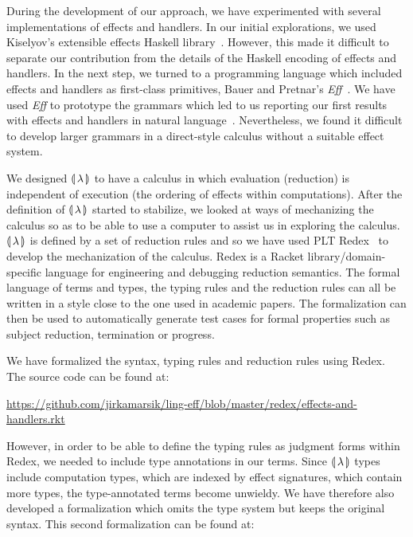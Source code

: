 \label{chap:mechanization}

During the development of our approach, we have experimented with several
implementations of effects and handlers. In our initial explorations, we
used Kiselyov's extensible effects Haskell
library~\cite{kiselyov2013extensible,extensible-effects}. However, this
made it difficult to separate our contribution from the details of the
Haskell encoding of effects and handlers. In the next step, we turned to a
programming language which included effects and handlers as first-class
primitives, Bauer and Pretnar's \emph{Eff}~\cite{bauer2012programming}. We
have used \emph{Eff} to prototype the grammars which led to us reporting
our first results with effects and handlers in natural
language~\cite{marsik2014algebraic}. Nevertheless, we found it difficult to
develop larger grammars in a direct-style calculus without a suitable
effect system.

We designed ${\llparenthesis \, \lambda \, \rrparenthesis}$ to have a calculus in which evaluation (reduction) is
independent of execution (the ordering of effects within
computations). After the definition of ${\llparenthesis \, \lambda \, \rrparenthesis}$ started to stabilize, we
looked at ways of mechanizing the calculus so as to be able to use a
computer to assist us in exploring the calculus. ${\llparenthesis \, \lambda \, \rrparenthesis}$ is defined by a
set of reduction rules and so we have used PLT
Redex~\cite{felleisen2009semantics} to develop the mechanization of the
calculus. Redex is a Racket library/domain-specific language for
engineering and debugging reduction semantics. The formal language of terms
and types, the typing rules and the reduction rules can all be written in a
style close to the one used in academic papers. The formalization can then
be used to automatically generate test cases for formal properties such as
subject reduction, termination or progress.

We have formalized the syntax, typing rules and reduction rules using
Redex. The source code can be found at:

\centerline{\url{https://github.com/jirkamarsik/ling-eff/blob/master/redex/effects-and-handlers.rkt}}

However, in order to be able to define the typing rules as judgment forms
within Redex, we needed to include type annotations in our terms. Since
${\llparenthesis \, \lambda \, \rrparenthesis}$ types include computation types, which are indexed by effect
signatures, which contain more types, the type-annotated terms become
unwieldy. We have therefore also developed a formalization which omits the
type system but keeps the original syntax. This second formalization can be
found at:

